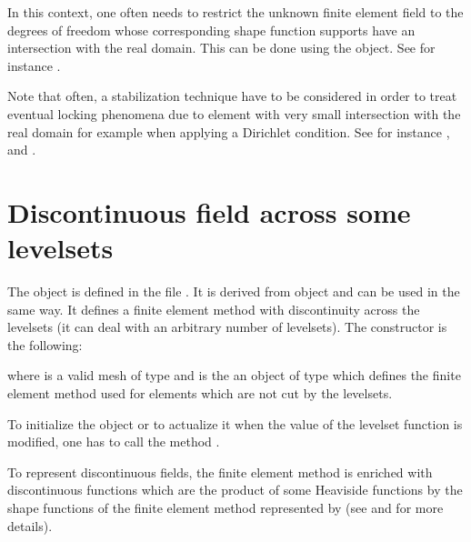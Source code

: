 \documentclass[a4paper,11pt,english]{sphinxmanual}
\begin{document}
In this context, one often needs to restrict the unknown finite element field to the degrees of freedom whose corresponding shape function supports have an intersection with the real domain. This can be done using the  object. See for instance .

Note that often, a stabilization technique have to be considered in order to treat eventual locking phenomena due to element with very small intersection with the real domain for example when applying a Dirichlet condition. See for instance ,   and .


\section{Discontinuous field across some level\sphinxhyphen{}sets}
\label{\detokenize{userdoc/xfem:discontinuous-field-across-some-level-sets}}
The object  is defined in the file
. It is derived from  object
and can be used in the same way. It defines a finite element method with
discontinuity across the level\sphinxhyphen{}sets (it can deal with an arbitrary number of
level\sphinxhyphen{}sets). The constructor is the following:

\begin{sphinxVerbatim}[commandchars=\\\{\}]
  
\end{sphinxVerbatim}

where  is a valid mesh of type  and  is the an object of type
 which defines the finite element method used for elements which are not
cut by the level\sphinxhyphen{}sets.

To initialize the object or to actualize it when the value of the level\sphinxhyphen{}set
function is modified, one has to call the method .

To represent discontinuous fields, the finite element method is enriched
with discontinuous functions which are the product of some Heaviside functions
by the shape functions of the finite element method represented by 
(see  and  for more details).
\end{document}
